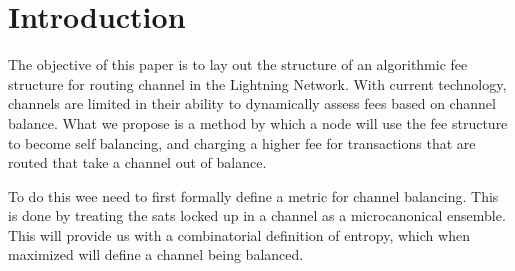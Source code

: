 \documentclass[review,12pt]{elsarticle}
\begin{document}

\linenumbers

\section{Introduction}
The objective of this paper is to lay out the structure of an algorithmic fee structure for routing channel in the Lightning Network.
With current technology, channels are limited in their ability to dynamically assess fees based on channel balance.
What we propose is a method by which a node will use the fee structure to become self balancing, and charging a higher fee for transactions that are routed that take a channel out of balance.

To do this wee need to first formally define a metric for channel balancing.
This is done by treating the sats locked up in a channel as a microcanonical ensemble.
This will provide us with a combinatorial definition of entropy, which when maximized will define a channel being balanced.
\end{document}
